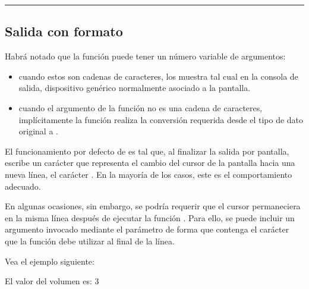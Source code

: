 \documentclass[letterpaper,10pt,english]{sphinxmanual}
\begin{document}
\bigskip\hrule\bigskip





\subsection{Salida con formato}
\label{\detokenize{Entrada_salida:salida-con-formato}}
Habrá notado que la función  puede tener un número variable de argumentos:
\begin{itemize}
\item {} 
cuando estos son cadenas de caracteres, los muestra tal cual en la consola de salida, dispositivo genérico normalmente asociado a la pantalla.

\item {} 
cuando el argumento de la función no es una cadena de caracteres, implícitamente la función  realiza  la conversión requerida desde el tipo de dato original a .

\end{itemize}

El funcionamiento por defecto de  es tal que, al finalizar la salida por pantalla, escribe un carácter que representa el cambio del cursor de la pantalla hacia una nueva línea, el carácter . En la mayoría de los casos, este es el comportamiento adecuado.

En algunas ocasiones, sin embargo, se podría requerir que el cursor permaneciera en la misma línea después de ejecutar la función . Para ello, se puede incluir un argumento invocado mediante el parámetro  de forma que contenga el carácter que la función debe utilizar al final de la línea.

Vea el ejemplo siguiente:

\begin{sphinxVerbatim}[commandchars=\\\{\}]
  
 
\end{sphinxVerbatim}

\begin{sphinxVerbatim}[commandchars=\\\{\}]
El valor del volumen es: 3
\end{sphinxVerbatim}
\end{document}
